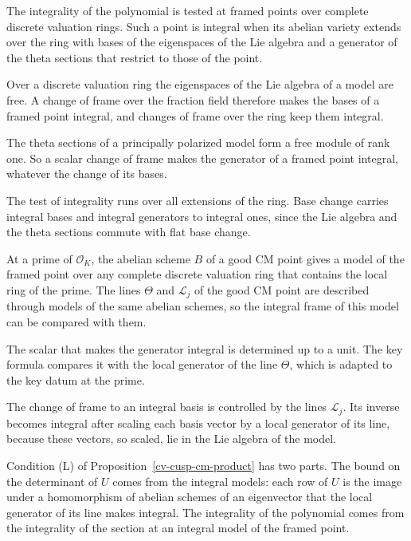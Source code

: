 The integrality of the polynomial is tested at framed points over complete discrete valuation rings. Such a point is
integral when its abelian variety extends over the ring with bases of the eigenspaces of the Lie algebra and a
generator of the theta sections that restrict to those of the point.

Over a discrete valuation ring the eigenspaces of the Lie algebra of a model are free. A change of frame over the
fraction field therefore makes the bases of a framed point integral, and changes of frame over the ring keep them
integral.

The theta sections of a principally polarized model form a free module of rank one. So a scalar change of frame
makes the generator of a framed point integral, whatever the change of its bases.

The test of integrality runs over all extensions of the ring. Base change carries integral bases and integral
generators to integral ones, since the Lie algebra and the theta sections commute with flat base change.

At a prime of $\mathcal O_K$, the abelian scheme $B$ of a good CM point gives a model of the framed point over any
complete discrete valuation ring that contains the local ring of the prime. The lines $\Theta$ and $\mathcal L_j$ of
the good CM point are described through models of the same abelian schemes, so the integral frame of this model can
be compared with them.

The scalar that makes the generator integral is determined up to a unit. The key formula compares it with the
local generator of the line $\Theta$, which is adapted to the key datum at the prime.

The change of frame to an integral basis is controlled by the lines $\mathcal L_j$. Its inverse becomes integral
after scaling each basis vector by a local generator of its line, because these vectors, so scaled, lie in the Lie
algebra of the model.

Condition (L) of Proposition~\ref{cv-cusp-cm-product} has two parts. The bound on the determinant of $U$ comes
from the integral models: each row of $U$ is the image under a homomorphism of abelian schemes of an eigenvector
that the local generator of its line makes integral. The integrality of the polynomial comes from the integrality
of the section at an integral model of the framed point.

